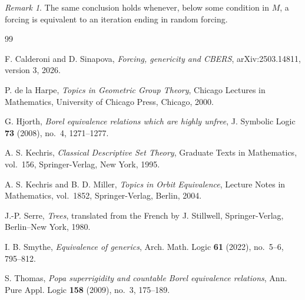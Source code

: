\documentclass[11pt]{amsart}
\theoremstyle{definition}
\theoremstyle{remark}
\newtheorem{remark}[theorem]{Remark}
\begin{document}
\begin{remark}
The same conclusion holds whenever, below some condition in $M$, a forcing is equivalent to an iteration ending in random forcing.
\end{remark}

\begin{thebibliography}{99}

F. Calderoni and D. Sinapova,
\emph{Forcing, genericity and CBERS},
arXiv:2503.14811, version 3, 2026.

P. de la Harpe,
\emph{Topics in Geometric Group Theory},
Chicago Lectures in Mathematics, University of Chicago Press, Chicago, 2000.

G. Hjorth,
\emph{Borel equivalence relations which are highly unfree},
J. Symbolic Logic \textbf{73} (2008), no.~4, 1271--1277.

A. S. Kechris,
\emph{Classical Descriptive Set Theory},
Graduate Texts in Mathematics, vol.~156, Springer-Verlag, New York, 1995.

A. S. Kechris and B. D. Miller,
\emph{Topics in Orbit Equivalence},
Lecture Notes in Mathematics, vol.~1852, Springer-Verlag, Berlin, 2004.

J.-P. Serre,
\emph{Trees},
translated from the French by J. Stillwell, Springer-Verlag, Berlin--New York, 1980.

I. B. Smythe,
\emph{Equivalence of generics},
Arch. Math. Logic \textbf{61} (2022), no.~5--6, 795--812.

S. Thomas,
\emph{Popa superrigidity and countable Borel equivalence relations},
Ann. Pure Appl. Logic \textbf{158} (2009), no.~3, 175--189.

\end{thebibliography}
\end{document}
